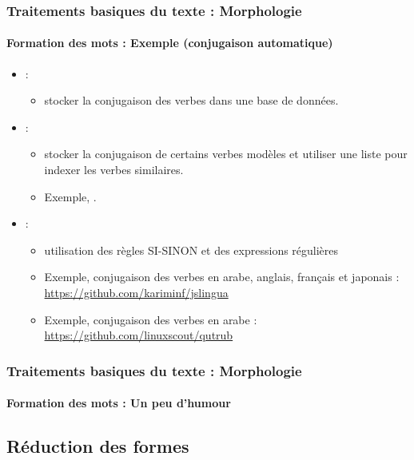 \documentclass[xcolor=table]{beamer}
\begin{document}
\begin{frame}
\frametitle{Traitements basiques du texte : Morphologie}
\framesubtitle{Formation des mots : Exemple (conjugaison automatique)}

\begin{itemize}
	\item {} :
	\begin{itemize}
		\item stocker la conjugaison des verbes dans une base de données.
	\end{itemize}
	\item {} :
	\begin{itemize}
		\item stocker la conjugaison de certains verbes modèles et utiliser une liste pour indexer les verbes similaires.
		\item Exemple, .
	\end{itemize}
	\item {} :
	\begin{itemize}
		\item utilisation des règles SI-SINON et des expressions régulières
		\item Exemple, conjugaison des verbes en arabe, anglais, français et japonais : \url{https://github.com/kariminf/jslingua}
		\item Exemple, conjugaison des verbes en arabe : \url{https://github.com/linuxscout/qutrub}
	\end{itemize}
\end{itemize}

\end{frame}

\begin{frame}
\frametitle{Traitements basiques du texte : Morphologie}
\framesubtitle{Formation des mots : Un peu d'humour}

\begin{center}
\end{center}

\end{frame}

\subsection{Réduction des formes}
\end{document}
